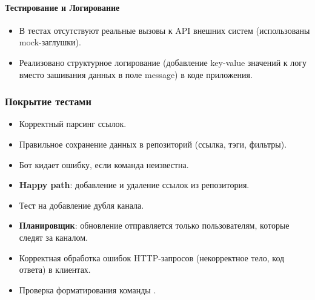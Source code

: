
\noindent{}

\paragraph*{Тестирование и Логирование}
\begin{itemize}
    \item В тестах отсутствуют реальные вызовы к API внешних систем (использованы mock-заглушки).
    \item Реализовано структурное логирование (добавление key-value значений к логу вместо зашивания данных в поле message) в коде приложения.
\end{itemize}

\subsubsection{Покрытие тестами}

\begin{itemize}
    \item Корректный парсинг ссылок.
    \item Правильное сохранение данных в репозиторий (ссылка, тэги, фильтры).
    \item Бот кидает ошибку, если команда неизвестна.
    \item \textbf{Happy path}: добавление и удаление ссылок из репозитория.
    \item Тест на добавление дубля канала.
    \item \textbf{Планировщик}: обновление отправляется только пользователям, которые следят за каналом.
    \item Корректная обработка ошибок HTTP-запросов (некорректное тело, код ответа) в клиентах.
    \item Проверка форматирования команды .
\end{itemize}
